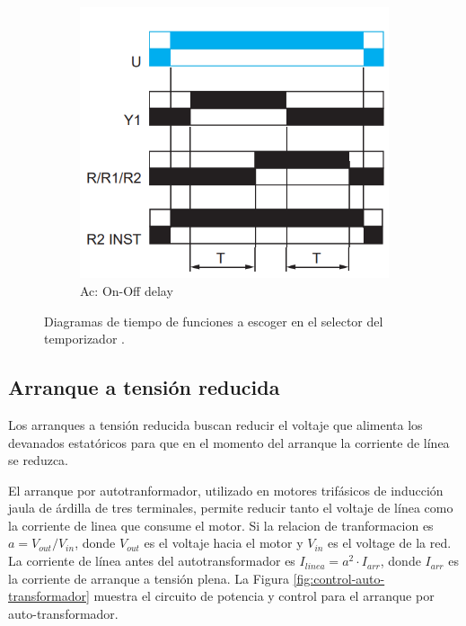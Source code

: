 \begin{figure}
\begin{subfigure}[b]{0.32\textwidth}
	\includegraphics[width=\textwidth]{Imagenes/Ac-On-OffDelay}
	\caption{Ac: On-Off delay }
	\label{fig:OnOff-delay}
	\end{subfigure}
	\caption{Diagramas de tiempo de funciones a escoger en el selector del temporizador \cite{Scheneider4}.}
	\label{fig:Funciones}
\end{figure}



\subsection{Arranque a tensión reducida}

Los arranques a tensión reducida buscan reducir el voltaje que alimenta los devanados estatóricos para que en el momento del arranque la corriente de línea se reduzca.

El arranque por autotranformador, utilizado en motores trifásicos de inducción jaula de árdilla de tres terminales, permite reducir tanto el voltaje de línea como la corriente de linea que consume el motor. Si la relacion de tranformacion es $a=V_{out}/V_{in}$, donde $V_{out}$ es el voltaje hacia el motor y $V_{in}$ es el voltage de la red. La corriente de línea antes del autotransformador es $I_{linea} = a^{2}\cdot I_{arr}$, donde $I_{arr}$ es la corriente de arranque a tensión plena. La Figura \ref{fig:control-auto-transformador} muestra el circuito de potencia y control para el arranque por auto-transformador.

